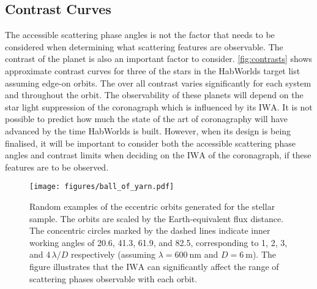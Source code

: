 \documentclass[
    usenatbib,
]{mnras}
\newcommand{\IWA}{\ensuremath{\mathrm{IWA}}}
\newcommand{\hwo}{HabWorlds}
\begin{document}

\subsection{Contrast Curves}
\label{sec:results_contrast}

The accessible scattering phase angles is not the factor that needs to be considered when determining what scattering features are observable.
%
The contrast of the planet is also an important factor to consider.
%
\cref{fig:contrasts} shows approximate contrast curves for three of the stars in the \hwo{} target list assuming edge-on orbits.
%
The over all contrast varies significantly for each system and throughout the orbit.
%
The observability of these planets will depend on the star light suppression of the coronagraph which is influenced by its \IWA{}.
%
It is not possible to predict how much the state of the art of coronagraphy will have advanced by the time \hwo{} is built.
%
However, when its design is being finalised, it will be important to consider both the accessible scattering phase angles and contrast limits when deciding on the \IWA{} of the coronagraph, if these features are to be observed.




\begin{figure*}
    \centering
    \texttt{[image: figures/ball\_of\_yarn.pdf]}  
    \caption{
        Random examples of the eccentric orbits generated for the stellar sample.
        The orbits are scaled by the Earth-equivalent flux distance. 
        The concentric circles marked by the dashed lines indicate inner working angles of 20.6, 41.3, 61.9, and \SI{82.5}{\mas}, corresponding to 1, 2, 3, and 4\,$\lambda / D$ respectively (assuming $\lambda = \SI{600}{\nano\meter}$ and $D = \SI{6}{\meter}$).
        The figure illustrates that the \IWA{} can significantly affect the range of scattering phases observable with each orbit.
    }
    \label{fig:ball-o-yarn}
\end{figure*}
 
\end{document}
